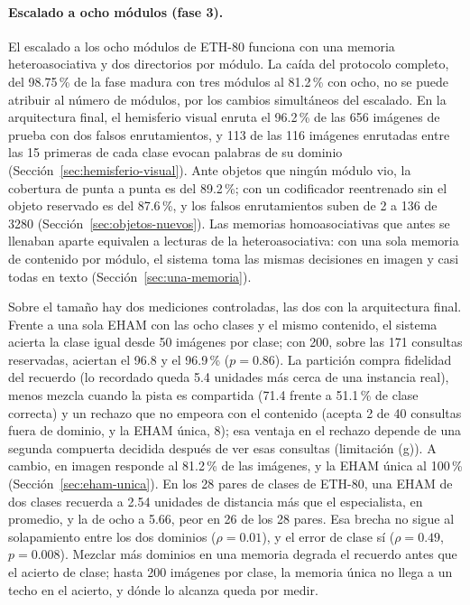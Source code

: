 \paragraph{Escalado a ocho módulos (fase 3).}
El escalado a los ocho módulos de ETH-80 funciona con una memoria heteroasociativa y dos
directorios por módulo.
La caída del protocolo completo, del 98.75\,\% de la fase madura con tres módulos al
81.2\,\% con ocho, no se puede atribuir al número de módulos, por los cambios simultáneos
del escalado.
En la arquitectura final, el hemisferio visual enruta el 96.2\,\% de las 656 imágenes de
prueba con dos falsos enrutamientos, y 113 de las 116 imágenes enrutadas entre las 15
primeras de cada clase evocan palabras de su dominio
(Sección~\ref{sec:hemisferio-visual}).
Ante objetos que ningún módulo vio, la cobertura de punta a punta es del 89.2\,\%; con un
codificador reentrenado sin el objeto reservado es del 87.6\,\%, y los falsos
enrutamientos suben de 2 a 136 de 3280 (Sección~\ref{sec:objetos-nuevos}).
Las memorias homoasociativas que antes se llenaban aparte equivalen a lecturas de la
heteroasociativa: con una sola memoria de contenido por módulo, el sistema toma las
mismas decisiones en imagen y casi todas en texto (Sección~\ref{sec:una-memoria}).

Sobre el tamaño hay dos mediciones controladas, las dos con la arquitectura final.
Frente a una sola EHAM con las ocho clases y el mismo contenido, el sistema acierta la
clase igual desde 50 imágenes por clase; con 200, sobre las 171 consultas reservadas,
aciertan el 96.8 y el 96.9\,\% ($p = 0.86$).
La partición compra fidelidad del recuerdo (lo recordado queda 5.4 unidades más cerca de
una instancia real), menos mezcla cuando la pista es compartida (71.4 frente a 51.1\,\% de
clase correcta) y un rechazo que no empeora con el contenido (acepta 2 de 40 consultas
fuera de dominio, y la EHAM única, 8); esa ventaja en el rechazo depende de una segunda
compuerta decidida después de ver esas consultas (limitación (g)).
A cambio, en imagen responde al 81.2\,\% de las imágenes, y la EHAM única al 100\,\%
(Sección~\ref{sec:eham-unica}).
En los 28 pares de clases de ETH-80, una EHAM de dos clases recuerda a 2.54 unidades de
distancia más que el especialista, en promedio, y la de ocho a 5.66, peor en 26 de los 28
pares.
Esa brecha no sigue al solapamiento entre los dos dominios ($\rho = 0.01$), y el error de
clase sí ($\rho = 0.49$, $p = 0.008$).
Mezclar más dominios en una memoria degrada el recuerdo antes que el acierto de clase;
hasta 200 imágenes por clase, la memoria única no llega a un techo en el acierto, y dónde
lo alcanza queda por medir.


